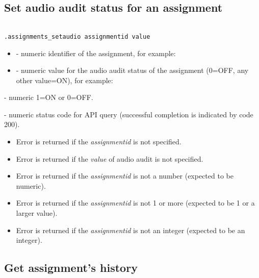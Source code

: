\subsection{Set audio audit status for an assignment}

\begin{lstlisting}[style=CommandLineStyle, showlines=true]

.assignments_setaudio assignmentid value

\end{lstlisting}

\paramsheader
\begin{itemize}

    \item {} - numeric identifier of the assignment, for
    example:

    \item {} - numeric value for the audio audit status of the
    assignment (0=OFF, any other value=ON), for example:

\end{itemize}

\savedres
\begin{compactitem}
    \item {} - numeric 1=ON or 0=OFF.
    \item {}  - numeric status code for API query
    (successful completion is indicated by code 200).
\end{compactitem}

\errheader
\begin{itemize}
    \item Error  is returned if the \textit{assignmentid} is not specified.
    \item Error  is returned if the \textit{value} of audio audit is not specified.
    \item Error  is returned if the \textit{assignmentid} is not a number (expected to be numeric).
    \item Error  is returned if the \textit{assignmentid} is not 1 or more (expected to be 1 or a larger value).
    \item Error  is returned if the \textit{assignmentid} is not an integer (expected to be an integer).
\end{itemize}

\subsection{Get assignment's history}

